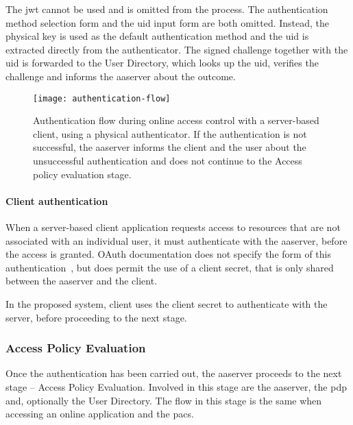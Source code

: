 The \acrshort{jwt} cannot be used and is omitted from the process. The authentication method selection form and the \acrshort{uid} input form are both omitted. Instead, the physical key is used as the default authentication method and the \acrshort{uid} is extracted directly from the authenticator. The signed challenge together with the \acrshort{uid} is forwarded to the User Directory, which looks up the \acrshort{uid}, verifies the challenge and informs the \acrshort{aaserver} about the outcome.

\begin{sidewaysfigure}[p]
    \centering
    \texttt{[image: authentication-flow]}
    \caption{Authentication flow during online access control with a server-based client, using a physical authenticator. If the authentication is not successful, the \acrshort{aaserver} informs the client and the user about the unsuccessful authentication and does not continue to the Access policy evaluation stage.}
    \label{fig:authentication-flow}
\end{sidewaysfigure}
\restoregeometry

\paragraph{Client authentication}
When a server-based client application requests access to resources that are not associated with an individual user, it must authenticate with the \acrshort{aaserver}, before the access is granted. OAuth documentation does not specify the form of this authentication~\cite{Hardt2012TheFramework}, but does permit the use of a client secret, that is only shared between the \acrshort{aaserver} and the client.

In the proposed system, client uses the client secret to authenticate with the server, before proceeding to the next stage.

\subsubsection{Access Policy Evaluation}
Once the authentication has been carried out, the \acrshort{aaserver} proceeds to the next stage -- Access Policy Evaluation. Involved in this stage are the \acrshort{aaserver}, the \acrshort{pdp} and, optionally the User Directory. The flow in this stage is the same when accessing an online application and the \acrshort{pacs}.

